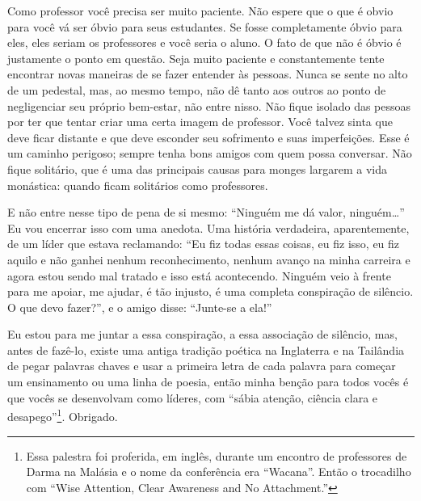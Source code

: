 Como professor você precisa ser muito paciente. Não espere que o que
é obvio para você vá ser óbvio para seus estudantes. Se fosse
completamente óbvio para eles, eles seriam os professores e você seria
o aluno. O fato de que não é óbvio é justamente o ponto em questão.
Seja muito paciente e constantemente tente encontrar novas maneiras de
se fazer entender às pessoas. Nunca se sente no alto de um pedestal,
mas, ao mesmo tempo, não dê tanto aos outros ao ponto de negligenciar
seu próprio bem-estar, não entre nisso. Não fique isolado das pessoas
por ter que tentar criar uma certa imagem de professor. Você talvez
sinta que deve ficar distante e que deve esconder seu sofrimento e suas
imperfeições. Esse é um caminho perigoso; sempre tenha bons amigos com
quem possa conversar. Não fique solitário, que é uma das principais
causas para monges largarem a vida monástica: quando ficam solitários
como professores. 

E não entre nesse tipo de pena de si mesmo: “Ninguém me dá valor,
ninguém…” Eu vou encerrar isso com uma anedota. Uma história
verdadeira, aparentemente, de um líder que estava reclamando: “Eu fiz
todas essas coisas, eu fiz isso, eu fiz aquilo e não ganhei nenhum
reconhecimento, nenhum avanço na minha carreira e agora estou sendo mal
tratado e isso está acontecendo. Ninguém veio à frente para me apoiar,
me ajudar, é tão injusto, é uma completa conspiração de silêncio. O que
devo fazer?”, e o amigo disse: “Junte-se a ela!” 

Eu estou para me juntar a essa conspiração, a essa associação de
silêncio, mas, antes de fazê-lo, existe uma antiga tradição poética na
Inglaterra e na Tailândia de pegar palavras chaves e usar a primeira
letra de cada palavra para começar um ensinamento ou uma linha de
poesia, então minha benção para todos vocês é que vocês se desenvolvam
como líderes, com “sábia atenção, ciência clara e
desapego”\footnote{Essa palestra foi proferida, em inglês, durante um
encontro de professores de Darma na Malásia e o nome da conferência era
“Wacana”. Então o trocadilho com “Wise Attention, Clear Awareness and
No Attachment.”}. Obrigado. 
